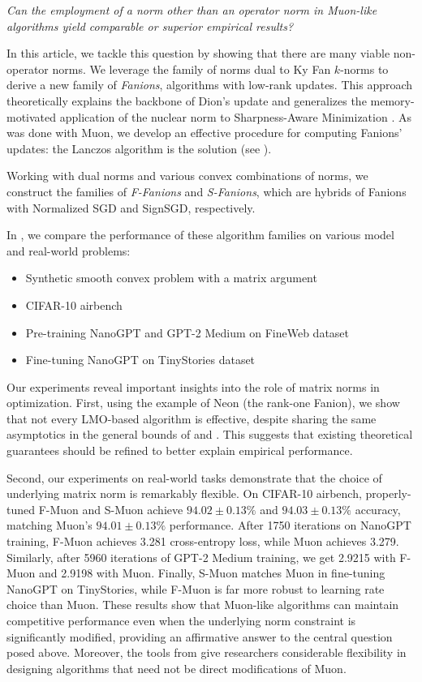 \documentclass[pmlr]{jmlr}%
\begin{document}
 \emph{Can the employment of a norm other than an operator norm in Muon-like algorithms yield comparable or superior empirical results?}
 
 In this article, we tackle this question by showing that there are many viable non-operator norms. We leverage the family of norms dual to Ky Fan $k$-norms to derive a new family of \emph{Fanions}, algorithms with low-rank updates. This approach theoretically explains the backbone of Dion's update \citep{ahn2025dion} and generalizes the memory-motivated application of the nuclear norm to Sharpness-Aware Minimization \citep{pethick2025sam}. As was done with Muon, we develop an effective procedure for computing Fanions' updates: the Lanczos algorithm is the solution (see ).
 
 Working with dual norms and various convex combinations of norms, we construct the families of \emph{F-Fanions} and \emph{S-Fanions}, which are hybrids of Fanions with Normalized SGD and SignSGD, respectively.
 
 In , we compare the performance of these algorithm families on various model and real-world problems:
 \begin{itemize}
   \item Synthetic smooth convex problem with a matrix argument
   \item CIFAR-10 airbench \citep{cifar2023airbench}
   \item Pre-training NanoGPT and GPT-2 Medium on FineWeb dataset \citep{modded_nanogpt_2024}
   \item Fine-tuning NanoGPT on TinyStories dataset \citep{eldan2023tinystoriessmalllanguagemodels}
 \end{itemize}
 
 Our experiments reveal important insights into the role of matrix norms in optimization. First, using the example of Neon (the rank-one Fanion), we show that not every LMO-based algorithm is effective, despite sharing the same asymptotics in the general bounds of \citep{kovalev2025understanding} and \citep{riabinin2025gluon}. This suggests that existing theoretical guarantees should be refined to better explain empirical performance.
 
 Second, our experiments on real-world tasks demonstrate that the choice of underlying matrix norm is remarkably flexible. On CIFAR-10 airbench, properly-tuned F-Muon and S-Muon achieve $94.02 \pm 0.13\%$ and $94.03 \pm 0.13\%$ accuracy, matching Muon's $94.01 \pm 0.13\%$ performance. After 1750 iterations on NanoGPT training, F-Muon achieves 3.281 cross-entropy loss, while Muon achieves 3.279. Similarly, after 5960 iterations of GPT-2 Medium training, we get 2.9215 with F-Muon and 2.9198 with Muon. Finally, S-Muon matches Muon in fine-tuning NanoGPT on TinyStories, while F-Muon is far more robust to learning rate choice than Muon. These results show that Muon-like algorithms can maintain competitive performance even when the underlying norm constraint is significantly modified, providing an affirmative answer to the central question posed above. Moreover, the tools from  give researchers considerable flexibility in designing algorithms that need not be direct modifications of Muon.
 
\end{document}

